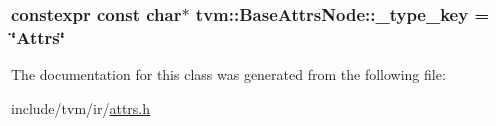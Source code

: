 \subsubsection[{\texorpdfstring{\+\_\+type\+\_\+key}{_type_key}}]{\setlength{\rightskip}{0pt plus 5cm}constexpr const char$\ast$ tvm\+::\+Base\+Attrs\+Node\+::\+\_\+type\+\_\+key = \char`\"{}Attrs\char`\"{}\hspace{0.3cm}{\ttfamily [static]}}\hypertarget{classtvm_1_1BaseAttrsNode_a8e4fd4e728774e0556cda84b0c2b80d6}{}\label{classtvm_1_1BaseAttrsNode_a8e4fd4e728774e0556cda84b0c2b80d6}


The documentation for this class was generated from the following file\+:\begin{DoxyCompactItemize}
\item 
include/tvm/ir/\hyperlink{ir_2attrs_8h}{attrs.\+h}\end{DoxyCompactItemize}
